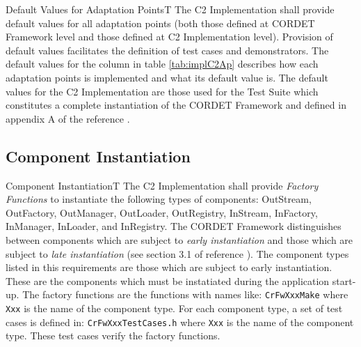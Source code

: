 \documentclass[a4paper,10pt]{article}
\newenvironment{fw_req}[6]
{\addtocounter{subsubsection}{1}
	\hspace{0.2cm}\textbf{CR-\arabic{section}.\arabic{subsection}.\arabic{subsubsection}/#2
	\hspace{0.8cm} #1}
	\vspace{-10pt}
\begin{longtable}{p{2.7cm}P{8.5cm}}
\hline
\textsc{Requirement} & #3 \\
\textsc{Justification} & #4 \\
\textsc{Implementation} & #5  \\ 
\textsc{Verification} & #6  \\
\hline
}
{\end{longtable}}
\begin{document}
\begin{fw_req}{Default Values for Adaptation Points}{T}
{The C2 Implementation shall provide default values for all adaptation points (both those defined at CORDET Framework level and those defined at C2 Implementation level).}
{Provision of default values facilitates the definition of test cases and demonstrators.}
{The default values for the  column in table \ref{tab:implC2Ap} describes how each adaptation points is implemented and what its default value is. } 
{The default values for the C2 Implementation are those used for the Test Suite which constitutes a complete instantiation of the CORDET Framework and defined in appendix A of the reference \cite{ref:C2Implementation}.}
\end{fw_req}


\subsection{Component Instantiation}

\begin{fw_req}{Component Instantiation}{T}
{The C2 Implementation shall provide \textit{Factory Functions} to instantiate the following types of components: OutStream, OutFactory, OutManager, OutLoader, OutRegistry, InStream, InFactory, InManager, InLoader, and InRegistry.}
{The CORDET Framework distinguishes between components which are subject to \textit{early instantiation} and those which are subject to \textit{late instantiation} (see section 3.1 of reference \cite{ref:cordetfw}). The component types listed in this requirements are those which are subject to early instantiation. These are the components which must be instatiated during the application start-up.}
{The factory functions are the functions with names like: \texttt{CrFwXxxMake} where \texttt{Xxx} is the name of the component type. } 
{For each component type, a set of test cases is defined in: \texttt{CrFwXxxTestCases.h} where \texttt{Xxx} is the name of the component type. These test cases verify the factory functions.}
\end{fw_req}
\end{document}
